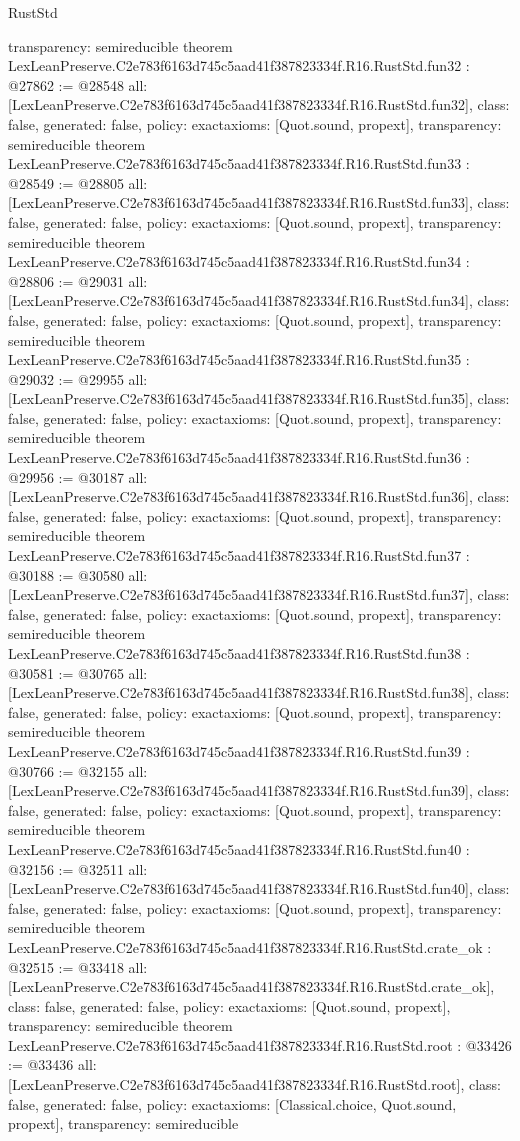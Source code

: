 \begin{lexlean}{RustStd}
\begin{coremodule}
{  transparency: semireducible
}
theorem LexLeanPreserve.C2e783f6163d745c5aad41f387823334f.R16.RustStd.fun32 : @27862 := @28548 {
  all: [LexLeanPreserve.C2e783f6163d745c5aad41f387823334f.R16.RustStd.fun32],
  class: false,
  generated: false,
  policy: exact{axioms: [Quot.sound, propext]},
  transparency: semireducible
}
theorem LexLeanPreserve.C2e783f6163d745c5aad41f387823334f.R16.RustStd.fun33 : @28549 := @28805 {
  all: [LexLeanPreserve.C2e783f6163d745c5aad41f387823334f.R16.RustStd.fun33],
  class: false,
  generated: false,
  policy: exact{axioms: [Quot.sound, propext]},
  transparency: semireducible
}
theorem LexLeanPreserve.C2e783f6163d745c5aad41f387823334f.R16.RustStd.fun34 : @28806 := @29031 {
  all: [LexLeanPreserve.C2e783f6163d745c5aad41f387823334f.R16.RustStd.fun34],
  class: false,
  generated: false,
  policy: exact{axioms: [Quot.sound, propext]},
  transparency: semireducible
}
theorem LexLeanPreserve.C2e783f6163d745c5aad41f387823334f.R16.RustStd.fun35 : @29032 := @29955 {
  all: [LexLeanPreserve.C2e783f6163d745c5aad41f387823334f.R16.RustStd.fun35],
  class: false,
  generated: false,
  policy: exact{axioms: [Quot.sound, propext]},
  transparency: semireducible
}
theorem LexLeanPreserve.C2e783f6163d745c5aad41f387823334f.R16.RustStd.fun36 : @29956 := @30187 {
  all: [LexLeanPreserve.C2e783f6163d745c5aad41f387823334f.R16.RustStd.fun36],
  class: false,
  generated: false,
  policy: exact{axioms: [Quot.sound, propext]},
  transparency: semireducible
}
theorem LexLeanPreserve.C2e783f6163d745c5aad41f387823334f.R16.RustStd.fun37 : @30188 := @30580 {
  all: [LexLeanPreserve.C2e783f6163d745c5aad41f387823334f.R16.RustStd.fun37],
  class: false,
  generated: false,
  policy: exact{axioms: [Quot.sound, propext]},
  transparency: semireducible
}
theorem LexLeanPreserve.C2e783f6163d745c5aad41f387823334f.R16.RustStd.fun38 : @30581 := @30765 {
  all: [LexLeanPreserve.C2e783f6163d745c5aad41f387823334f.R16.RustStd.fun38],
  class: false,
  generated: false,
  policy: exact{axioms: [Quot.sound, propext]},
  transparency: semireducible
}
theorem LexLeanPreserve.C2e783f6163d745c5aad41f387823334f.R16.RustStd.fun39 : @30766 := @32155 {
  all: [LexLeanPreserve.C2e783f6163d745c5aad41f387823334f.R16.RustStd.fun39],
  class: false,
  generated: false,
  policy: exact{axioms: [Quot.sound, propext]},
  transparency: semireducible
}
theorem LexLeanPreserve.C2e783f6163d745c5aad41f387823334f.R16.RustStd.fun40 : @32156 := @32511 {
  all: [LexLeanPreserve.C2e783f6163d745c5aad41f387823334f.R16.RustStd.fun40],
  class: false,
  generated: false,
  policy: exact{axioms: [Quot.sound, propext]},
  transparency: semireducible
}
theorem LexLeanPreserve.C2e783f6163d745c5aad41f387823334f.R16.RustStd.crate_ok : @32515 := @33418 {
  all: [LexLeanPreserve.C2e783f6163d745c5aad41f387823334f.R16.RustStd.crate_ok],
  class: false,
  generated: false,
  policy: exact{axioms: [Quot.sound, propext]},
  transparency: semireducible
}
theorem LexLeanPreserve.C2e783f6163d745c5aad41f387823334f.R16.RustStd.root : @33426 := @33436 {
  all: [LexLeanPreserve.C2e783f6163d745c5aad41f387823334f.R16.RustStd.root],
  class: false,
  generated: false,
  policy: exact{axioms: [Classical.choice, Quot.sound, propext]},
  transparency: semireducible
}


\end{coremodule}
\end{lexlean}
